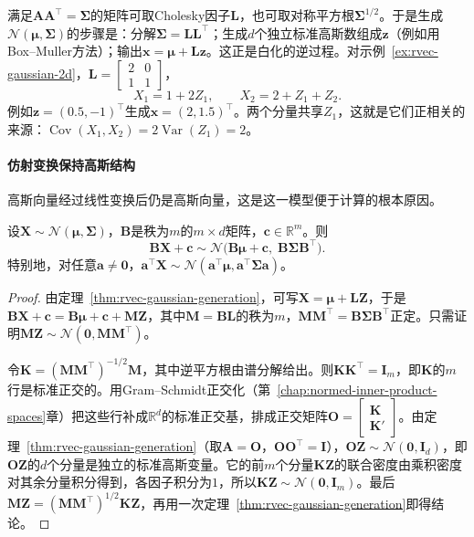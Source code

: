 满足$\bm A\bm A^{\top}=\bm\Sigma$的矩阵可取Cholesky因子$\bm L$，也可取对称平方根$\bm\Sigma^{1/2}$。于是生成$\mathcal N(\bm\mu,\bm\Sigma)$的步骤是：分解$\bm\Sigma=\bm L\bm L^{\top}$；生成$d$个独立标准高斯数组成$\bm z$（例如用Box--Muller方法）；输出$\bm x=\bm\mu+\bm L\bm z$。这正是白化的逆过程。对示例~\ref{ex:rvec-gaussian-2d}，$\bm L=\begin{bmatrix}2&0\\1&1\end{bmatrix}$，
\[
 X_1=1+2Z_1,\qquad X_2=2+Z_1+Z_2 .
\]
例如$\bm z=(0.5,-1)^{\top}$生成$\bm x=(2,1.5)^{\top}$。两个分量共享$Z_1$，这就是它们正相关的来源：$\operatorname{Cov}(X_1,X_2)=2\operatorname{Var}(Z_1)=2$。

\paragraph{仿射变换保持高斯结构}
高斯向量经过线性变换后仍是高斯向量，这是这一模型便于计算的根本原因。

\begin{theorem}[仿射变换]
\label{thm:rvec-gaussian-affine}
设$\bm X\sim\mathcal N(\bm\mu,\bm\Sigma)$，$\bm B$是秩为$m$的$m\times d$矩阵，$\bm c\in\mathbb R^m$。则
\[
 \bm B\bm X+\bm c\sim\mathcal N\bigl(\bm B\bm\mu+\bm c,\;\bm B\bm\Sigma\bm B^{\top}\bigr).
\]
特别地，对任意$\bm a\neq\bm0$，$\bm a^{\top}\bm X\sim\mathcal N(\bm a^{\top}\bm\mu,\bm a^{\top}\bm\Sigma\bm a)$。
\end{theorem}

\begin{proof}
由定理~\ref{thm:rvec-gaussian-generation}，可写$\bm X=\bm\mu+\bm L\bm Z$，于是$\bm B\bm X+\bm c=\bm B\bm\mu+\bm c+\bm M\bm Z$，其中$\bm M=\bm B\bm L$的秩为$m$，$\bm M\bm M^{\top}=\bm B\bm\Sigma\bm B^{\top}$正定。只需证明$\bm M\bm Z\sim\mathcal N(\bm0,\bm M\bm M^{\top})$。

令$\bm K=(\bm M\bm M^{\top})^{-1/2}\bm M$，其中逆平方根由谱分解给出。则$\bm K\bm K^{\top}=\bm I_m$，即$\bm K$的$m$行是标准正交的。用Gram--Schmidt正交化（第~\ref{chap:normed-inner-product-spaces}章）把这些行补成$\mathbb R^d$的标准正交基，排成正交矩阵$\bm O=\begin{bmatrix}\bm K\\\bm K'\end{bmatrix}$。由定理~\ref{thm:rvec-gaussian-generation}（取$\bm A=\bm O$，$\bm O\bm O^{\top}=\bm I$），$\bm O\bm Z\sim\mathcal N(\bm0,\bm I_d)$，即$\bm O\bm Z$的$d$个分量是独立的标准高斯变量。它的前$m$个分量$\bm K\bm Z$的联合密度由乘积密度对其余分量积分得到，各因子积分为$1$，所以$\bm K\bm Z\sim\mathcal N(\bm0,\bm I_m)$。最后$\bm M\bm Z=(\bm M\bm M^{\top})^{1/2}\bm K\bm Z$，再用一次定理~\ref{thm:rvec-gaussian-generation}即得结论。
\end{proof}

